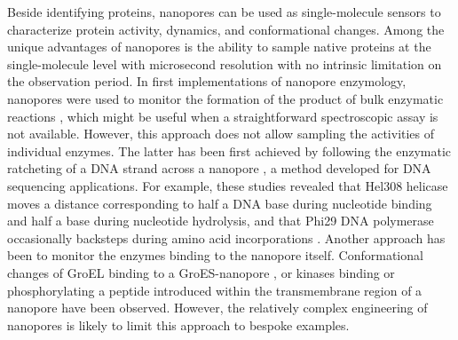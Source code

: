Beside identifying proteins, nanopores can be used as single-molecule sensors to characterize protein activity, dynamics, and conformational changes. Among the unique advantages of nanopores is the ability to sample native proteins at the single-molecule level with microsecond resolution with no intrinsic limitation on the observation period. In first implementations of nanopore enzymology, nanopores were used to monitor the formation of the product of bulk enzymatic reactions \cite{Kukwikila2015}, which might be useful when a straightforward spectroscopic assay is not available. However, this approach does not allow sampling the activities of individual enzymes. The latter has been first achieved by following the enzymatic ratcheting of a DNA strand across a nanopore \cite{Chu2010}, a method developed for DNA sequencing applications. For example, these studies revealed that Hel308 helicase moves a distance corresponding to half a DNA base during nucleotide binding and half a base during nucleotide hydrolysis, and that Phi29 DNA polymerase occasionally backsteps during amino acid incorporations \cite{Manrao2012}. Another approach has been to monitor the enzymes binding to the nanopore itself. Conformational changes of GroEL binding to a GroES-nanopore \cite{Chavis2017}, or kinases binding or phosphorylating a peptide introduced within the transmembrane region of a nanopore \cite{Cheley2006} have been observed. However, the relatively complex engineering of nanopores is likely to limit this approach to bespoke examples. 


